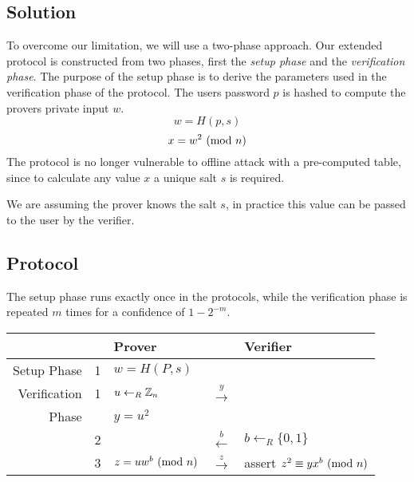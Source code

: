 \subsection{Solution}
To overcome our limitation, we will use a two-phase approach. Our extended protocol is constructed from two phases, first the \textit{setup phase} and the \textit{verification phase}.
The purpose of the setup phase is to derive the parameters used in the verification phase of the protocol.
The users password $p$ is hashed to compute the provers private input $w$.
$$w = H(p, s)$$
$$x = w^2 \ (\mathrm{mod}\ n)$$
The protocol is no longer vulnerable to offline attack with a pre-computed table, since to calculate any value $x$ a unique salt $s$ is required.

We are assuming the prover knows the salt $s$, in practice this value can be passed to the user by the verifier.

\subsection{Protocol}
The setup phase runs exactly once in the protocols, while the verification phase is repeated $m$ times for a confidence of $1 - 2^{-m}$.

\begin{center}
	\begin{tabular}{rrl|c|l}
  		& & Prover & & Verifier\\
  		\hline
		Setup Phase & 1 & $w = H(P, s)$ & & \\
		\hline
		Verification & 1 & $u \leftarrow_R \Bbb{Z}_{n}$ & $\xrightarrow{y}$ \\
		Phase& & $y = u^2$ & \\
		& 2 & & $\xleftarrow{b}$ & $b \leftarrow_R \{0, 1\} $ \\
		& 3 & $z = uw^b \ (\mathrm{mod}\ n) $ & $\xrightarrow{z}$ & assert $z^2 \equiv yx^b \ (\mathrm{mod}\ n)$\\ 
	\end{tabular}
\end{center}

%
%
%





